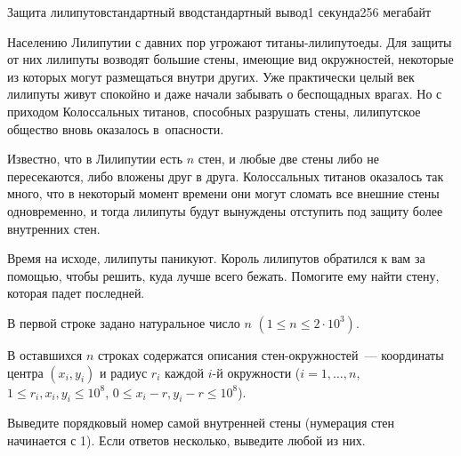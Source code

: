 \begin{problem}{Защита лилипутов}{стандартный ввод}{стандартный вывод}{1 секунда}{256 мегабайт}

Населению Лилипутии с давних пор угрожают титаны-лилипутоеды. Для защиты от них лилипуты возводят большие стены, имеющие вид окружностей, некоторые из которых могут размещаться внутри других. Уже практически целый век лилипуты живут спокойно и даже начали забывать о беспощадных врагах. Но с приходом Колоссальных титанов, способных разрушать стены, лилипутское общество вновь оказалось в~опасности.

Известно, что в Лилипутии есть $n$ стен, и любые две стены либо не пересекаются, либо вложены друг в друга. Колоссальных титанов оказалось так много, что в некоторый момент времени они могут сломать все внешние стены одновременно, и тогда лилипуты будут вынуждены отступить под защиту более внутренних стен. 

Время на исходе, лилипуты паникуют. Король лилипутов обратился к вам за помощью, чтобы решить, куда лучше всего бежать. Помогите ему найти стену, которая падет последней. 



\InputFile
В первой строке задано натуральное число $n$ $(1 \leq n \leq 2 \cdot 10^3)$. 

В оставшихся $n$ строках содержатся описания стен-окружностей~--- координаты центра $(x_{i}, y_{i})$ и радиус $r_{i}$ каждой $i$-й окружности ($i = 1, \dots, n$, $1 \leq r_{i}, x_{i}, y_{i} \leq 10^8$, $0\leq x_{i} - r, y_{i} - r \leq 10^8$).

\OutputFile
Выведите порядковый номер самой внутренней стены (нумерация стен начинается с 1). Если ответов несколько, выведите любой из них.

\Examples

\begin{example}
%
%
\end{example}


\end{problem}
